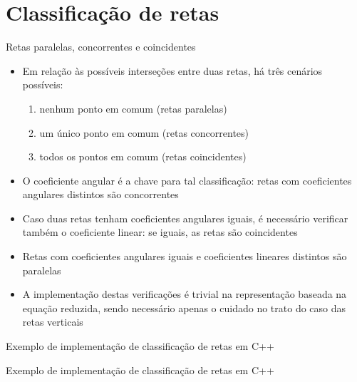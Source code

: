 \section{Classificação de retas}

\begin{frame}[fragile]{Retas paralelas, concorrentes e coincidentes}

    \begin{itemize}
        \item Em relação às possíveis interseções entre duas retas, há três cenários possíveis:
        \pause

        \begin{enumerate}
            \item nenhum ponto em comum (retas paralelas)
        \pause
            \item um único ponto em comum  (retas concorrentes)
        \pause
            \item todos os pontos em comum (retas coincidentes)
        \end{enumerate}
        \pause

        \item O coeficiente angular é a chave para tal classificação: retas com coeficientes
            angulares distintos são concorrentes
        \pause

        \item Caso duas retas tenham coeficientes angulares iguais, é necessário verificar também
            o coeficiente linear: se iguais, as retas são coincidentes
        \pause

        \item Retas com coeficientes angulares iguais e coeficientes lineares distintos são paralelas
        \pause

        \item A implementação destas verificações é trivial na representação baseada na equação reduzida, sendo necessário apenas o cuidado no trato do caso das retas verticais
    \end{itemize}

\end{frame}

\begin{frame}[fragile]{Exemplo de implementação de classificação de retas em C++}
\end{frame}

\begin{frame}[fragile]{Exemplo de implementação de classificação de retas em C++}
\end{frame}

